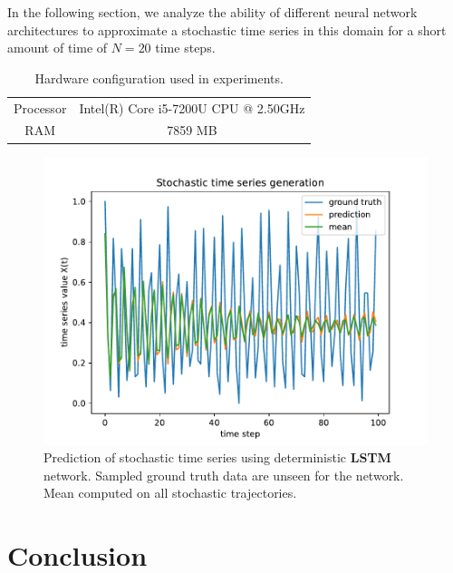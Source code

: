 \documentclass{article}
\begin{document}
In the following section, we analyze the ability of different neural network
architectures to approximate a stochastic time series in this domain for a short
amount of time of $N=20$ time steps.

\begin{table}
  \centering
  \begin{tabular}{cc}
    Processor & Intel(R) Core i5-7200U CPU @ 2.50GHz \\
    RAM       & 7859 MB                              \\
  \end{tabular}
  \caption{Hardware configuration used in experiments.}
  \label{tab:hardware}
\end{table}

\begin{figure}
  \centering
  \includegraphics[width=\textwidth]{figures/nn_limitation.pdf}
  \caption{Prediction of stochastic time series using deterministic
    \textbf{LSTM} network. Sampled ground truth data are unseen for the network.
    Mean computed on all stochastic trajectories.}
  \label{fig:nn_limitation}
\end{figure}

\section{Conclusion}
\end{document}
